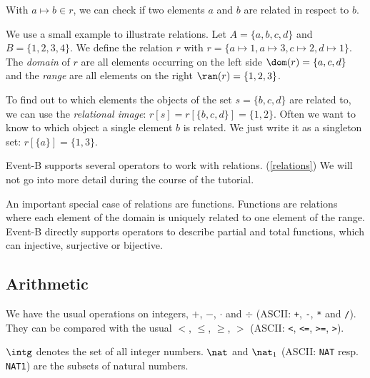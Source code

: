 With $a\mapsto b\in r$, we can check if two elements $a$ and $b$ are related in respect to $b$.

We use a small example to illustrate relations. Let $A = \{a,b,c,d\}$ and $B=\{1,2,3,4\}$.
We define the relation $r$ with $r = \{a\mapsto 1, a\mapsto 3, c\mapsto 2, d\mapsto 1\}$.
The \emph{domain} of $r$ are all elements occurring on the left side $\dom(r) = \{a,c,d\}$ and the
\emph{range} are all elements on the right $\ran(r)=\{1,2,3\}$.

To find out to which elements the objects of the set $s=\{b,c,d\}$ are related to, we can use the \emph{relational image}:
$r[s] = r[\{b,c,d\}] = \{1,2\}$.
Often we want to know to which object a single element $b$ is related. We just write it as a singleton
set: $r[\{a\}] = \{1,3\}$.

Event-B supports several operators to work with relations. (\ref{relations})
We will not go into more detail during the course of the tutorial.

An important special case of relations are functions. Functions are relations where each element of the
domain is uniquely related to one element of the range. Event-B directly supports operators to describe
partial and total functions, which can injective, surjective or bijective.

\subsection{Arithmetic}
\label{tut_arithmetic}
We have the usual operations on integers, $+$, $-$, $\cdot$ and $\div$ (ASCII: \texttt{+}, \texttt{-},
\texttt{*} and \texttt{/}). They can be compared with the usual $<$, $\leq$, $\geq$, $>$ (ASCII: \texttt{<}, \texttt{<=}, \texttt{>=}, \texttt{>}).

$\intg$  denotes the set of all integer numbers. $\nat$ and $\nat_1$ (ASCII: \texttt{NAT} resp. 
\texttt{NAT1}) are the subsets of natural numbers.



